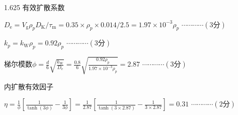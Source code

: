 \documentclass[12pt, b5paper]{article}
\begin{document}
\begin{spacing}{1.625}
有效扩散系数

$D_\mathrm{e} = V_\mathrm{g}\rho_p D_\mathrm{K}/\tau_\mathrm{m} = 0.35\times \rho_p \times 0.014/2.5 = 1.97\times 10^{-3}\rho_p$ \hfill  $\cdots \cdots \cdots \cdots (3\text{分})$ 

$k_p = k_\mathrm{W}\rho_p = 0.92\rho_p$ \hfill  $\cdots \cdots \cdots \cdots (3\text{分})$ 

梯尔模数$\phi = \frac{d}{6}\sqrt{\frac{k_\mathrm{W}}{D_\mathrm{e}}} = \frac{0.8}{6}\sqrt{\frac{0.92\rho_p}{1.97\times 10^{-3}\rho_p}} = 2.87$ \hfill $\cdots \cdots \cdots \cdots (3\text{分})$ 

内扩散有效因子

$\eta = \frac{1}{\phi}\left[\frac{1}{\tanh (3\phi)}-\frac{1}{3\phi}\right] = \frac{1}{2.87}\left[\frac{1}{\tanh (3\times 2.87)}-\frac{1}{3\times 2.87}\right] = 0.31$ \hfill $\cdots \cdots \cdots \cdots (2\text{分})$ 

\end{spacing}
\end{document}
